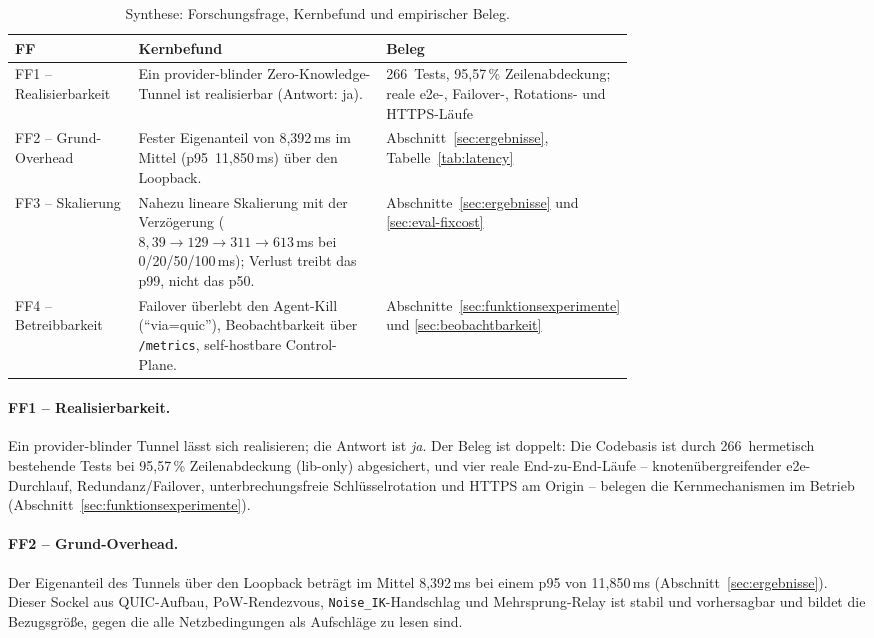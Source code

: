 \begin{table}[t]
  \centering
  \caption{Synthese: Forschungsfrage, Kernbefund und empirischer Beleg.}
  \label{tab:ff-synthese}
  \small
  \begin{tabular}{@{}lp{0.40\linewidth}p{0.32\linewidth}@{}}
    \toprule
    FF & Kernbefund & Beleg \\
    \midrule
    FF1 -- Realisierbarkeit & Ein provider-blinder Zero-Knowledge-Tunnel ist
      realisierbar (Antwort: ja). & 266~Tests, 95{,}57\,\% Zeilenabdeckung; reale
      e2e-, Failover-, Rotations- und HTTPS-Läufe \\
    FF2 -- Grund-Overhead & Fester Eigenanteil von 8{,}392\,ms im Mittel
      (p95~11{,}850\,ms) über den Loopback. & Abschnitt~\ref{sec:ergebnisse},
      Tabelle~\ref{tab:latency} \\
    FF3 -- Skalierung & Nahezu lineare Skalierung mit der Verzögerung
      ($8{,}39 \rightarrow 129 \rightarrow 311 \rightarrow 613$\,ms bei
      0/20/50/100\,ms); Verlust treibt das p99, nicht das p50. &
      Abschnitte~\ref{sec:ergebnisse} und \ref{sec:eval-fixcost} \\
    FF4 -- Betreibbarkeit & Failover überlebt den Agent-Kill (\enquote{via=quic}),
      Beobachtbarkeit über \texttt{/metrics}, self-hostbare Control-Plane. &
      Abschnitte~\ref{sec:funktionsexperimente} und \ref{sec:beobachtbarkeit} \\
    \bottomrule
  \end{tabular}
\end{table}

\paragraph{FF1 -- Realisierbarkeit.} Ein provider-blinder Tunnel lässt sich
realisieren; die Antwort ist \emph{ja}. Der Beleg ist doppelt: Die Codebasis ist
durch 266~hermetisch bestehende Tests bei 95{,}57\,\% Zeilenabdeckung (lib-only)
abgesichert, und vier reale End-zu-End-Läufe -- knotenübergreifender e2e-Durchlauf,
Redundanz/Failover, unterbrechungsfreie Schlüsselrotation und HTTPS am Origin --
belegen die Kernmechanismen im Betrieb (Abschnitt~\ref{sec:funktionsexperimente}).

\paragraph{FF2 -- Grund-Overhead.} Der Eigenanteil des Tunnels über den Loopback
beträgt im Mittel 8{,}392\,ms bei einem p95 von 11{,}850\,ms
(Abschnitt~\ref{sec:ergebnisse}). Dieser Sockel aus QUIC-Aufbau, PoW-Rendezvous,
\texttt{Noise\_IK}-Handschlag und Mehrsprung-Relay ist stabil und vorhersagbar
und bildet die Bezugsgröße, gegen die alle Netzbedingungen als Aufschläge zu
lesen sind.

